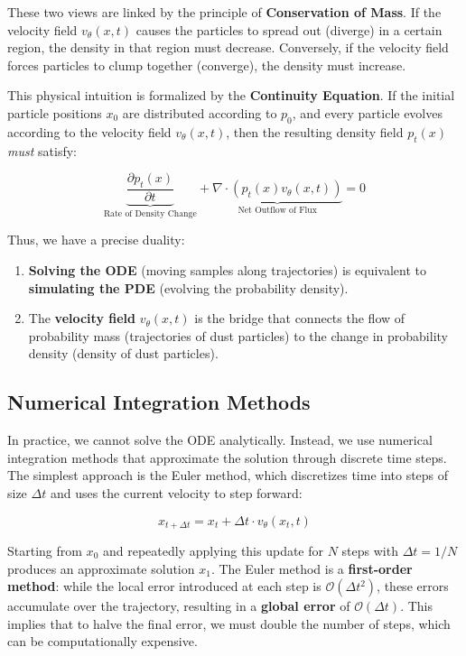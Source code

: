 \documentclass{book}
\begin{document}
These two views are linked by the principle of \textbf{Conservation of Mass}. If the velocity field $v_\theta(x,t)$ causes the particles to spread out (diverge) in a certain region, the density in that region must decrease. Conversely, if the velocity field forces particles to clump together (converge), the density must increase.

This physical intuition is formalized by the \textbf{Continuity Equation}. If the initial particle positions $x_0$ are distributed according to $p_0$, and every particle evolves according to the velocity field $v_\theta(x,t)$, then the resulting density field $p_t(x)$ \textit{must} satisfy:

\begin{equation}
\underbrace{\frac{\partial p_t(x)}{\partial t}}_{\text{Rate of Density Change}} + \underbrace{\nabla \cdot (p_t(x) v_\theta(x, t))}_{\text{Net Outflow of Flux}} = 0
\end{equation}

Thus, we have a precise duality:
\begin{enumerate}
    \item \textbf{Solving the ODE} (moving samples along trajectories) is equivalent to \textbf{simulating the PDE} (evolving the probability density).
    \item The \textbf{velocity field} $v_\theta(x,t)$ is the bridge that connects the flow of probability mass (trajectories of dust particles) to the change in probability density (density of dust particles).
\end{enumerate}

\subsection{Numerical Integration Methods}

In practice, we cannot solve the ODE analytically. Instead, we use numerical integration methods that approximate the solution through discrete time steps. The simplest approach is the Euler method, which discretizes time into steps of size $\Delta t$ and uses the current velocity to step forward:

\begin{equation}
x_{t + \Delta t} = x_t + \Delta t \cdot v_\theta(x_t, t)
\end{equation}

Starting from $x_0$ and repeatedly applying this update for $N$ steps with $\Delta t = 1/N$ produces an approximate solution $x_1$. The Euler method is a \textbf{first-order method}: while the local error introduced at each step is $\mathcal{O}(\Delta t^2)$, these errors accumulate over the trajectory, resulting in a \textbf{global error} of $\mathcal{O}(\Delta t)$. This implies that to halve the final error, we must double the number of steps, which can be computationally expensive.
\end{document}

